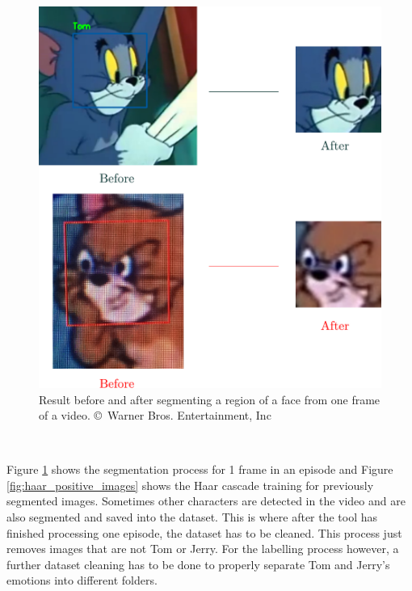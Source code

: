 \documentclass[report, 11pt, oneside]{dissertation}
\begin{document}
\inputminted[frame=single, firstline=39, lastline=53, baselinestretch=1, linenos]{python}{segmentation.py}
\label{listing:haar_cascade}

\begin{figure}[!htb]
   \centering
	\includegraphics[scale=0.45]{figure_28.pdf}
	\caption[Before and after segmenting a region of a face]{Result before and after segmenting a region of a face from one frame of a video. \copyright \ Warner Bros. Entertainment, Inc}
	\label{fig:segmentation_1}
\end{figure}

\ \

Figure \ref{fig:segmentation_1} shows the segmentation process for 1 frame in an episode and Figure \ref{fig:haar_positive_images} shows the Haar cascade training for previously segmented images. Sometimes other characters are detected in the video and are also segmented and saved into the dataset. This is where after the tool has finished processing one episode, the dataset has to be cleaned. This process just removes images that are not Tom or Jerry.  For the labelling process however, a further dataset cleaning has to be done to properly separate Tom and Jerry's emotions into different folders.
\end{document}

